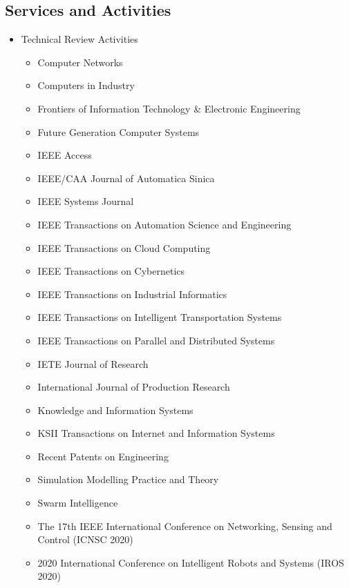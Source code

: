 \documentclass[margin,line]{res}
\begin{document}
\begin{resume}
\section{\sc Services and Activities}
\begin{itemize}
	\item Technical Review Activities
	\begin{itemize}
		\item Computer Networks
		\item Computers in Industry
		\item Frontiers of Information Technology \& Electronic Engineering
		\item Future Generation Computer Systems
		\item IEEE Access
		\item IEEE/CAA Journal of Automatica Sinica
		\item IEEE Systems Journal
		\item IEEE Transactions on Automation Science and Engineering
		\item IEEE Transactions on Cloud Computing
		\item IEEE Transactions on Cybernetics
		\item IEEE Transactions on Industrial Informatics
		\item IEEE Transactions on Intelligent Transportation Systems
		\item IEEE Transactions on Parallel and Distributed Systems
		\item IETE Journal of Research
		\item International Journal of Production Research
		\item Knowledge and Information Systems
		\item KSII Transactions on Internet and Information Systems
		\item Recent Patents on Engineering
		\item Simulation Modelling Practice and Theory
		\item Swarm Intelligence
		\item The 17th IEEE International Conference on Networking, Sensing and Control (ICNSC 2020)
		\item 2020 International Conference on Intelligent Robots and Systems (IROS 2020)
	\end{itemize}
\end{itemize}


\end{resume}
\end{document}
